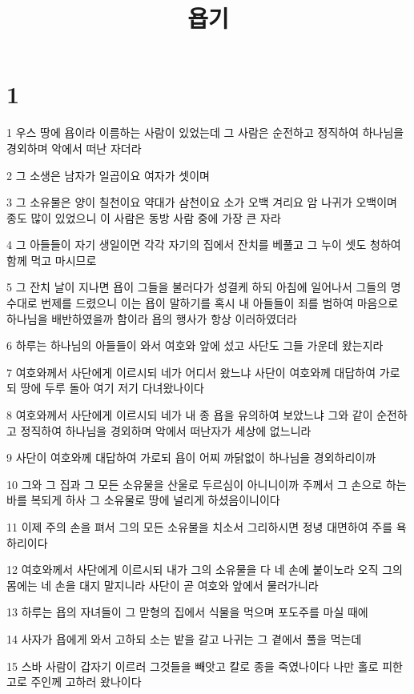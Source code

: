

\title{욥기}


\chapter{1}

\par 1 우스 땅에 욥이라 이름하는 사람이 있었는데 그 사람은 순전하고 정직하여 하나님을 경외하며 악에서 떠난 자더라
\par 2 그 소생은 남자가 일곱이요 여자가 셋이며
\par 3 그 소유물은 양이 칠천이요 약대가 삼천이요 소가 오백 겨리요 암 나귀가 오백이며 종도 많이 있었으니 이 사람은 동방 사람 중에 가장 큰 자라
\par 4 그 아들들이 자기 생일이면 각각 자기의 집에서 잔치를 베풀고 그 누이 셋도 청하여 함께 먹고 마시므로
\par 5 그 잔치 날이 지나면 욥이 그들을 불러다가 성결케 하되 아침에 일어나서 그들의 명수대로 번제를 드렸으니 이는 욥이 말하기를 혹시 내 아들들이 죄를 범하여 마음으로 하나님을 배반하였을까 함이라 욥의 행사가 항상 이러하였더라
\par 6 하루는 하나님의 아들들이 와서 여호와 앞에 섰고 사단도 그들 가운데 왔는지라
\par 7 여호와께서 사단에게 이르시되 네가 어디서 왔느냐 사단이 여호와께 대답하여 가로되 땅에 두루 돌아 여기 저기 다녀왔나이다
\par 8 여호와께서 사단에게 이르시되 네가 내 종 욥을 유의하여 보았느냐 그와 같이 순전하고 정직하여 하나님을 경외하며 악에서 떠난자가 세상에 없느니라
\par 9 사단이 여호와께 대답하여 가로되 욥이 어찌 까닭없이 하나님을 경외하리이까
\par 10 그와 그 집과 그 모든 소유물을 산울로 두르심이 아니니이까 주께서 그 손으로 하는 바를 복되게 하사 그 소유물로 땅에 널리게 하셨음이니이다
\par 11 이제 주의 손을 펴서 그의 모든 소유물을 치소서 그리하시면 정녕 대면하여 주를 욕하리이다
\par 12 여호와께서 사단에게 이르시되 내가 그의 소유물을 다 네 손에 붙이노라 오직 그의 몸에는 네 손을 대지 말지니라 사단이 곧 여호와 앞에서 물러가니라
\par 13 하루는 욥의 자녀들이 그 맏형의 집에서 식물을 먹으며 포도주를 마실 때에
\par 14 사자가 욥에게 와서 고하되 소는 밭을 갈고 나귀는 그 곁에서 풀을 먹는데
\par 15 스바 사람이 갑자기 이르러 그것들을 빼앗고 칼로 종을 죽였나이다 나만 홀로 피한고로 주인께 고하러 왔나이다
